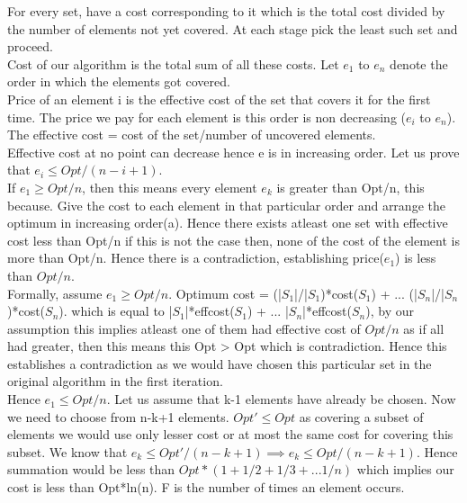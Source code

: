 \documentclass[solution,addpoints,12pt]{exam}
\begin{document}
For every set, have a cost corresponding to it which is the
total cost divided by the number of elements not yet covered.
At each stage pick the least such set and proceed.\\

Cost of our algorithm is the total sum of all these costs.
Let $e_1$ to $e_n$ denote the order in which the elements got
covered.\\

Price of an element i is the effective cost of the set
that covers it for the first time. The price we
pay for each element is this order is non decreasing ($e_i$ to $e_n$).
The effective cost = cost of the set/number of uncovered elements.\\
Effective cost at no point can decrease hence e is
in increasing order.
Let us prove that $e_i \le Opt/(n-i+1)$.\\
If $e_1 \ge Opt/n$, then this means every element
$e_k$ is greater than Opt/n, this because. Give the cost
to each element in that particular order and arrange
the optimum in increasing order(a). Hence there
exists atleast one set with effective cost less than Opt/n
if this is not the case then, none of the cost of the element
is more than Opt/n. Hence there is a contradiction, establishing
price($e_1$) is less than $Opt/n$.\\
Formally, assume $e_1 \ge Opt/n$.
Optimum cost = (|$S_1$|/|$S_1$)*cost($S_1$) + ... (|$S_n$|/|$S_n$)*cost($S_n$).
which is equal to |$S_1$|*effcost($S_1$) + ... |$S_n$|*effcost($S_n$),
by our assumption this implies atleast one of them
had effective cost of $Opt/n$ as if all had greater, then this means
this Opt > Opt which is contradiction. Hence this establishes
a contradiction as we would have chosen this particular
set in the original algorithm in the first iteration.\\
Hence $e_1 \le Opt/n$.
Let us assume that k-1 elements have already be chosen.
Now we need to choose from n-k+1 elements. $Opt' \le Opt$
as covering a subset of elements we would use only lesser cost or
at most the same cost for covering this subset. We know
that $e_k \le Opt'/(n-k+1) \implies e_k \le Opt/(n-k+1)$.
Hence summation would be less than $Opt*(1 + 1/2 + 1/3 + ... 1/n)$
which implies our cost is less than Opt*ln(n).
F is the number of times an element occurs.\\
\end{document}
